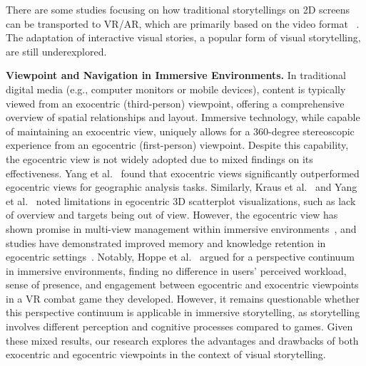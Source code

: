There are some studies focusing on how traditional storytellings on 2D screens can be transported to VR/AR, which are primarily based on the video format ~\cite{yang2023understanding, Zollmann2020CasualVRVideos, Nash2018Virtually}. The adaptation of interactive visual stories, a popular form of visual storytelling, are still underexplored. 

\noindent\textbf{Viewpoint and Navigation in Immersive Environments.}
In traditional digital media (e.g., computer monitors or mobile devices), content is typically viewed from an exocentric (third-person) viewpoint, offering a comprehensive overview of spatial relationships and layout. Immersive technology, while capable of maintaining an exocentric view, uniquely allows for a 360-degree stereoscopic experience from an egocentric (first-person) viewpoint. Despite this capability, the egocentric view is not widely adopted due to mixed findings on its effectiveness. 
Yang et al.~\cite{yang2018maps} found that exocentric views significantly outperformed egocentric views for geographic analysis tasks. Similarly, Kraus et al.~\cite{kraus2019impact} and Yang et al.~\cite{yang2020embodied} noted limitations in egocentric 3D scatterplot visualizations, such as lack of overview and targets being out of view. 
However, the egocentric view has shown promise in multi-view management within immersive environments~\cite{in2024evaluating,davidson2022exploring,satriadi2020maps,luo2022should}, and studies have demonstrated improved memory and knowledge retention in egocentric settings~\cite{krokos2019virtual,yang2020virtual}. 
{Notably, Hoppe et al.~\cite{hoppe2022there} argued for a perspective continuum in immersive environments, finding no difference in users' perceived workload, sense of presence, and engagement between egocentric and exocentric viewpoints in a VR combat game they developed. However, it remains questionable whether this perspective continuum is applicable in immersive storytelling, as storytelling involves different perception and cognitive processes compared to games.} 
Given these mixed results, our research explores the advantages and drawbacks of both exocentric and egocentric viewpoints in the context of visual storytelling.

